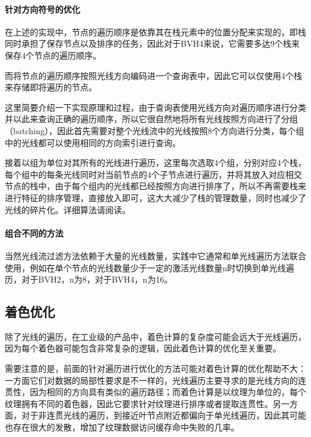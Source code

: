 \paragraph{针对方向符号的优化}
在上述\cite{a:DynamicRayStreamTraversal}的实现中，节点的遍历顺序是依靠其在栈元素中的位置分配来实现的，即栈同时承担了保存节点以及排序的任务，因此对于BVH4来说，它需要多达9个栈来保存4个节点的遍历顺序。

而\cite{a:EfficientRayTracingKernelsforModernCPUArchitectures}将节点的遍历顺序按照光线方向编码进一个查询表中，因此它可以仅使用4个栈来存储即将遍历的节点。

这里简要介绍一下实现原理和过程，由于查询表使用光线方向对遍历顺序进行分类并以此来查询正确的遍历顺序，所以它很自然地将所有光线按照方向进行了分组（batching），因此首先需要对整个光线流中的光线按照8个方向进行分类，每个组中的光线都可以使用相同的方向索引进行查询。

接着以组为单位对其所有的光线进行遍历，这里每次选取4个组，分别对应4个栈，每个组中的每条光线同时对当前节点的4个子节点进行遍历，并将其放入对应相交节点的栈中，由于每个组内的光线都已经按照方向进行排序了，所以不再需要栈来进行特征的排序管理，直接放入即可，这大大减少了栈的管理数量，同时也减少了光线的碎片化。详细算法请阅读\cite{a:EfficientRayTracingKernelsforModernCPUArchitectures}。





\paragraph{组合不同的方法}
当然光线流过滤方法依赖于大量的光线数量，实践中它通常和单光线遍历方法联合使用\cite{a:CombiningSingleandPacketRayTracingforArbitraryRayDistributionsontheIntelRMICArchitecture,a:DynamicRayStreamTraversal,a:EfficientRayTracingKernelsforModernCPUArchitectures}，例如\cite{a:DynamicRayStreamTraversal}在单个节点的光线数量少于一定的激活光线数量n时切换到单光线遍历，对于BVH2，n为8，对于BVH4，n为16。








\subsection{着色优化}\label{sec:pt-shading}
除了光线的遍历，在工业级的产品中，着色计算的复杂度可能会远大于光线遍历，因为每个着色器可能包含非常复杂的逻辑，因此着色计算的优化至关重要。

需要注意的是，前面的针对遍历进行优化的方法可能对着色计算的优化帮助不大：一方面它们对数据的局部性要求是不一样的，光线遍历主要寻求的是光线方向的连贯性，因为相同的方向具有类似的遍历路径；而着色计算是以纹理为单位的，每个纹理拥有不同的着色器，因此它要求针对纹理进行排序或者提取连贯性。另一方面，对于非连贯光线的遍历，到接近叶节点附近都偏向于单光线遍历，因此其可能也存在很大的发散，增加了纹理数据访问缓存命中失败的几率。

